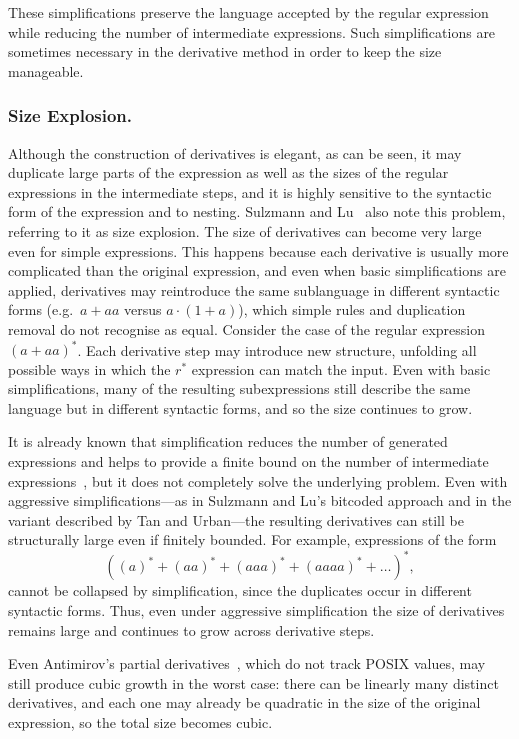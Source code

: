 \documentclass[12pt]{article}
\begin{document}
These simplifications preserve the language accepted by the regular expression
while reducing the number of intermediate expressions. Such simplifications are
sometimes necessary in the derivative method in order to keep the size
manageable.

\FloatBarrier
\subsubsection{Size Explosion.}  

Although the construction of derivatives is elegant, as can be seen, it may
duplicate large parts of the expression as well as the sizes of the regular
expressions in the intermediate steps, and it is highly sensitive to the
syntactic form of the expression and to nesting. Sulzmann and
Lu~\cite{Sulzmann2014} also note this problem, referring to it as size
explosion.
The size of derivatives can become very large even for simple expressions. 
This happens because each derivative is usually more complicated than the
original expression, and even when basic simplifications are applied,
derivatives may reintroduce the same sublanguage in different syntactic forms
(e.g.\ $a+aa$ versus $a \cdot (1+a)$), which simple rules and duplication
removal do not recognise as equal. Consider the case of the regular expression
$(a+aa)^*$. Each derivative step may introduce new structure, unfolding all
possible ways in which the $r^*$ expression can match the input. Even with
basic simplifications, many of the resulting subexpressions still describe the
same language but in different syntactic forms, and so the size continues to
grow.

It is already known that simplification reduces the number of generated
expressions and helps to provide a finite bound on the number of intermediate
expressions~\cite{Sulzmann2014,TanAndUrban2023}, but it does not completely
solve the underlying problem. Even with aggressive simplifications---as in
Sulzmann and Lu’s bitcoded approach and in the variant described by Tan and
Urban---the resulting derivatives can still be structurally large even if
finitely bounded. For example, expressions of the form
\[
((a)^* + (aa)^* + (aaa)^* + (aaaa)^* + \dots )^*,
\]
cannot be collapsed by simplification, since the duplicates occur in different
syntactic forms. Thus, even under aggressive simplification the size of
derivatives remains large and continues to grow across derivative steps.

Even Antimirov’s partial derivatives~\cite{Antimirov1996}, which do not track
POSIX values, may still produce cubic growth in the worst case: there can be
linearly many distinct derivatives, and each one may already be quadratic in
the size of the original expression, so the total size becomes cubic.
\end{document}
